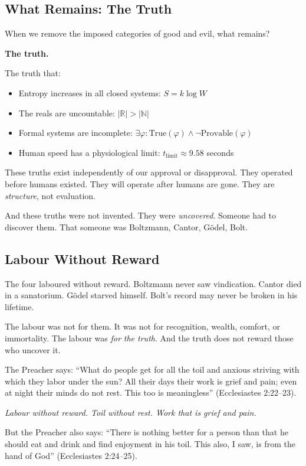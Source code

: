 \documentclass[11pt,a4paper]{article}
\begin{document}
\subsection{What Remains: The Truth}

When we remove the imposed categories of good and evil, what remains?

\textbf{The truth.}

The truth that:
\begin{itemize}[leftmargin=2em]
\item Entropy increases in all closed systems: $S = k \log W$
\item The reals are uncountable: $|\mathbb{R}| > |\mathbb{N}|$
\item Formal systems are incomplete: $\exists \varphi: \text{True}(\varphi) 
\land \neg \text{Provable}(\varphi)$
\item Human speed has a physiological limit: $t_{\text{limit}} \approx 9.58$ 
seconds
\end{itemize}

These truths exist independently of our approval or disapproval. They operated 
before humans existed. They will operate after humans are gone. They are 
\emph{structure}, not evaluation.

And these truths were not invented. They were \emph{uncovered}. Someone had to 
discover them. That someone was Boltzmann, Cantor, Gödel, Bolt.

\subsection{Labour Without Reward}

The four laboured without reward. Boltzmann never saw vindication. Cantor died 
in a sanatorium. Gödel starved himself. Bolt's record may never be broken in 
his lifetime.

The labour was not for them. It was not for recognition, wealth, comfort, or 
immortality. The labour was \emph{for the truth}. And the truth does not 
reward those who uncover it.

The Preacher says: ``What do people get for all the toil and anxious striving 
with which they labor under the sun? All their days their work is grief and 
pain; even at night their minds do not rest. This too is meaningless'' 
(Ecclesiastes 2:22--23).

\emph{Labour without reward. Toil without rest. Work that is grief and pain.}

But the Preacher also says: ``There is nothing better for a person than that 
he should eat and drink and find enjoyment in his toil. This also, I saw, is 
from the hand of God'' (Ecclesiastes 2:24--25).
\end{document}
